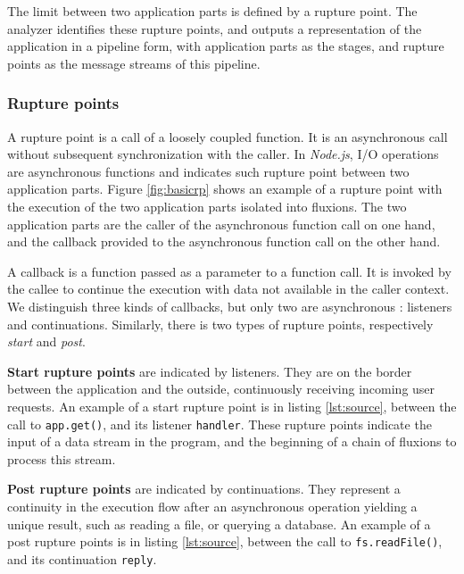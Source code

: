 The limit between two application parts is defined by a rupture point.
The analyzer identifies these rupture points, and outputs a representation of the application in a pipeline form, with application parts as the stages, and rupture points as the message streams of this pipeline.

\subsubsection{Rupture points} \label{section:compiler:analyzer:rupture}

A rupture point is a call of a loosely coupled function.
It is an asynchronous call without subsequent synchronization with the caller.
In \textit{Node.js}, I/O operations are asynchronous functions and indicates such rupture point between two application parts.
Figure \ref{fig:basicrp} shows an example of a rupture point with the execution of the two application parts isolated into fluxions.
The two application parts are the caller of the asynchronous function call on one hand, and the callback provided to the asynchronous function call on the other hand.

A callback is a function passed as a parameter to a function call.
It is invoked by the callee to continue the execution with data not available in the caller context.
We distinguish three kinds of callbacks, but only two are asynchronous : listeners and continuations.
Similarly, there is two types of rupture points, respectively \textit{start} and \textit{post}.

\textbf{Start rupture points} are indicated by listeners. They are on the border between the application and the outside, continuously receiving incoming user requests.
An example of a start rupture point is in listing \ref{lst:source}, between the call to \texttt{app.get()}, and its listener \texttt{handler}.
These rupture points indicate the input of a data stream in the program, and the beginning of a chain of fluxions to process this stream.

\textbf{Post rupture points} are indicated by continuations.
They represent a continuity in the execution flow after an asynchronous operation yielding a unique result, such as reading a file, or querying a database.
An example of a post rupture points is in listing \ref{lst:source}, between the call to \texttt{fs.readFile()}, and its continuation \texttt{reply}.


